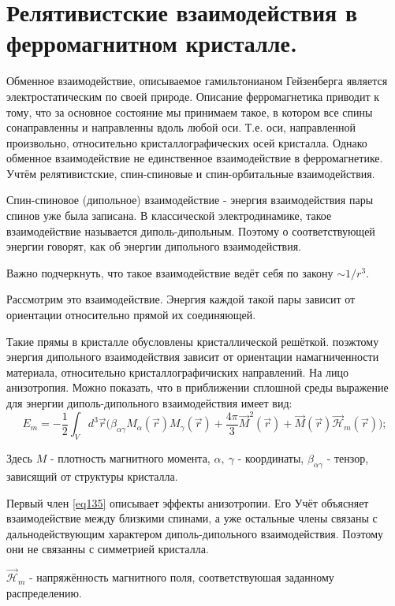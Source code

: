 \documentclass[a4paper, 14pt, russian]{article}
\newcommand{\be}{\begin{equation}}
\newcommand{\ee}{\end{equation}}
\begin{document}
	\section{Релятивистские взаимодействия в 
	ферромагнитном кристалле.}

	Обменное взаимодействие, описываемое гамильтонианом Гейзенберга
	является электростатическим по своей природе. Описание
	ферромагнетика приводит к тому, что за основное состояние
	мы принимаем такое, в котором все спины сонаправленны 
	и направленны вдоль любой оси. Т.е. оси, направленной 
	произвольно, относительно кристаллографических осей кристалла.
	Однако обменное взаимодействие не единственное взаимодействие
	в ферромагнетике. Учтём релятивистские, спин-спиновые
	и спин-орбитальные взаимодействия.

	Спин-спиновое (дипольное) взаимодействие - энергия
	взаимодействия пары спинов уже была записана. В 
	классической электродинамике, такое взаимодействие называется
	диполь-дипольным. Поэтому о соответствующей энергии
	говорят, как об энергии дипольного взаимодействия.

	Важно подчеркнуть, что такое взаимодействие ведёт себя по закону
	$\sim 1 / r^3$.

	Рассмотрим это взаимодействие. Энергия каждой такой пары
	зависит от ориентации относительно прямой их соединяющей. 

	Такие прямы в кристалле обусловлены кристаллической
	решёткой. поэжтому энергия дипольного взаимодействия 
	зависит от ориентации намагниченности материала, относительно
	кристаллографичиских направлений. На лицо анизотропия.
	Можно показать, что в приближении сплошной среды
	выражение для энергии диполь-дипольного взаимодействия
	имеет вид:
	\be
		\label{eq135}
		E_m = -\frac{1}{2} \int_V d^3 \vec r \big(\beta_{\alpha\gamma} M_\alpha(\vec r)
			M_\gamma(\vec r) + \frac{4\pi}{3} \vec{M}^2 (\vec r)
			+ \vec{M}(\vec r) \vec{\mathcal H}_m(\vec r)\big);
	\ee

	Здесь $M$ - плотность магнитного момента, $\alpha,~\gamma$ - координаты, 
	$\beta_{\alpha \gamma}$ - тензор, зависящий от структуры кристалла.

	Первый член \ref{eq135} описывает эффекты анизотропии. Его Учёт 
	объясняет взаимодействие между близкими спинами, а уже остальные члены
	связаны с дальнодействующим характером диполь-дипольного взаимодействия.
	Поэтому они не связанны с симметрией кристалла.
	
	$\vec{\mathcal H}_m$ - напряжённость магнитного поля, соответствуюшая 
	заданному распределению.
\end{document}

